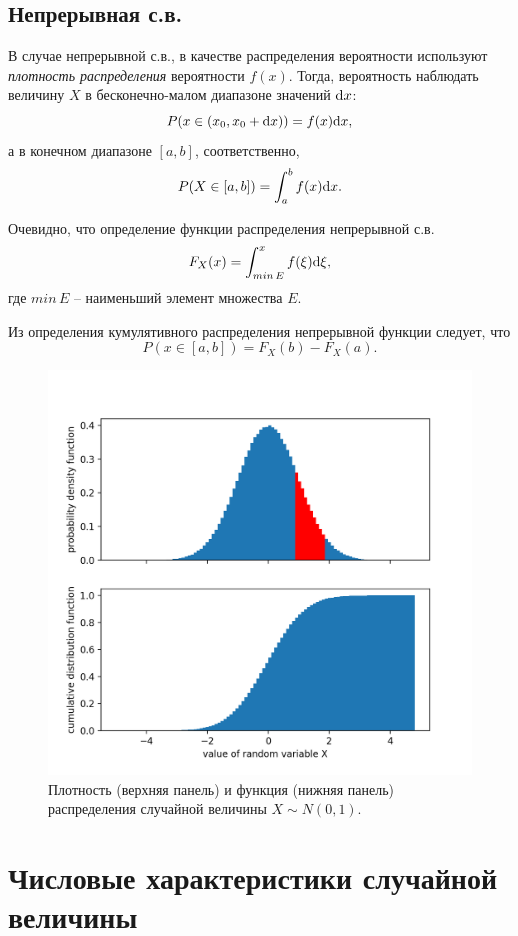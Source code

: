 \documentclass{report}
\begin{document}
\subsection{Непрерывная с.в.}
В случае непрерывной с.в., в качестве распределения вероятности используют \emph{плотность распределения} вероятности $f(x)$. Тогда, вероятность наблюдать величину $X$ в бесконечно-малом диапазоне значений $\mathrm d x$:
\[
P(x\in (x_0, x_0+\mathrm d x)) = f(x)\mathrm d x,
\]
а в конечном диапазоне $[a, b]$, соответственно,
\[
P(X\in[a,b]) = \int_a^b f(x)\mathrm d x.
\]

Очевидно, что определение функции распределения непрерывной с.в.
\[
F_X(x) = \int_{min\, E}^x f(\xi)\mathrm d\xi,
\]
где $min\, E$ -- наименьший элемент множества $E$.

\begin{rmk}
	Из определения кумулятивного распределения непрерывной функции следует, что 
	\[
	P(x\in[a,b]) = F_X(b) - F_X(a).
	\]
\end{rmk}

\begin{figure}[h]
	\includegraphics[width=\linewidth]{Normal_pdf_cdf}
	\caption{Плотность (верхняя панель) и функция (нижняя панель) распределения случайной величины $X\sim N(0, 1)$.\label{fig:continuous_rv_pdf_cdf}}
\end{figure}


\section{Числовые характеристики случайной величины}
\end{document}
